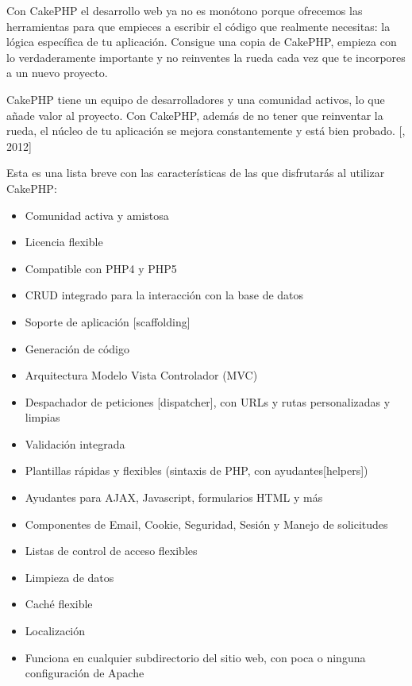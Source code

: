 Con CakePHP el desarrollo web ya no es monótono porque ofrecemos las herramientas para que empieces a escribir el código que realmente necesitas: la lógica específica de tu aplicación. Consigue una copia de CakePHP, empieza con lo verdaderamente importante y no reinventes la rueda cada vez que te incorpores a un nuevo proyecto.

CakePHP tiene un equipo de desarrolladores y una comunidad activos, lo que añade valor al proyecto. Con CakePHP, además de no tener que reinventar la rueda, el núcleo de tu aplicación se mejora constantemente y está bien probado. [\citet{cakebib}, 2012]

Esta es una lista breve con las características de las que disfrutarás al utilizar CakePHP:
\setlength{\parskip}{0mm}
\begin{itemize}

	\item Comunidad activa y amistosa

    \item Licencia flexible
    
    \item Compatible con PHP4 y PHP5
    
    \item CRUD integrado para la interacción con la base de datos
    
    \item Soporte de aplicación [scaffolding]
    
    \item Generación de código
    
    \item Arquitectura Modelo Vista Controlador (MVC)
    
    \item Despachador de peticiones [dispatcher], con URLs y rutas personalizadas y limpias
    
    \item Validación integrada
    
    \item Plantillas rápidas y flexibles (sintaxis de PHP, con ayudantes[helpers])
    
    \item Ayudantes para AJAX, Javascript, formularios HTML y más
    
    \item Componentes de Email, Cookie, Seguridad, Sesión y Manejo de solicitudes
    
    \item Listas de control de acceso flexibles
    
    \item Limpieza de datos
    
    \item Caché flexible
    
    \item Localización
    
    \item Funciona en cualquier subdirectorio del sitio web, con poca o ninguna configuración de Apache

	
	
\end{itemize}

